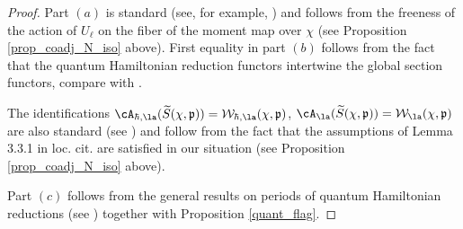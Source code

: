 \documentclass[12pt]{amsart}
\begin{document}
\begin{proof}
Part $(a)$ is standard (see, for example, \cite[Section 3.3]{Losev_isofquant}) and follows from the freeness of the action of $U_\ell$ on the fiber of the moment map over $\chi$ (see Proposition \ref{prop_coadj_N_iso} above). 
First equality in part $(b)$ follows from the fact that the quantum Hamiltonian reduction functors intertwine the global section functors, compare with \cite[Section 3.3.4]{Losev_cacticells}. 

The identifications $\cA_{\hbar,\la}(\widetilde{S}(\chi,\mathfrak{p})) = \mathcal{W}_{\hbar,\la}(\chi,\mathfrak{p})$, $\cA_{\la}(\widetilde{S}(\chi,\mathfrak{p})) = \mathcal{W}_{\la}(\chi,\mathfrak{p})$ are also standard (see \cite[Section 3.3]{Losev_isofquant}) and follow from the fact that the assumptions of Lemma 3.3.1 in loc. cit. are satisfied in our situation (see Proposition \ref{prop_coadj_N_iso} above).  

	Part $(c)$ follows from the general results on periods of quantum Hamiltonian reductions (see 
	\cite[Section 5]{Losev_isofquant}) together with Proposition \ref{quant_flag}. 
	\end{proof}
\end{document}
